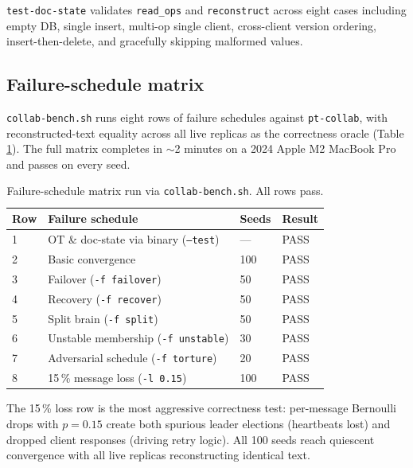 \documentclass[11pt]{article}
\newcommand{\code}[1]{\texttt{#1}}
\begin{document}
\code{test-doc-state} validates \code{read\_ops} and \code{reconstruct} across eight cases including empty DB, single insert, multi-op single client, cross-client version ordering, insert-then-delete, and gracefully skipping malformed values.

\subsection{Failure-schedule matrix}

\code{collab-bench.sh} runs eight rows of failure schedules against \code{pt-collab}, with reconstructed-text equality across all live replicas as the correctness oracle (Table \ref{tab:bench}). The full matrix completes in $\sim$2 minutes on a 2024 Apple M2 MacBook Pro and passes on every seed.

\begin{table}[h]
\centering
\caption{Failure-schedule matrix run via \code{collab-bench.sh}. All rows pass.}
\label{tab:bench}
\begin{tabular}{l l l l}
\toprule
\textbf{Row} & \textbf{Failure schedule} & \textbf{Seeds} & \textbf{Result}\\
\midrule
1 & OT \& doc-state via binary (\code{--test}) & ---            & PASS \\
2 & Basic convergence                          & 100            & PASS \\
3 & Failover (\code{-f failover})              & 50             & PASS \\
4 & Recovery (\code{-f recover})               & 50             & PASS \\
5 & Split brain (\code{-f split})              & 50             & PASS \\
6 & Unstable membership (\code{-f unstable})   & 30             & PASS \\
7 & Adversarial schedule (\code{-f torture})   & 20             & PASS \\
8 & 15\,\% message loss (\code{-l 0.15})       & 100            & PASS \\
\bottomrule
\end{tabular}
\end{table}

The 15\,\% loss row is the most aggressive correctness test: per-message Bernoulli drops with $p=0.15$ create both spurious leader elections (heartbeats lost) and dropped client responses (driving retry logic). All 100 seeds reach quiescent convergence with all live replicas reconstructing identical text.
\end{document}
